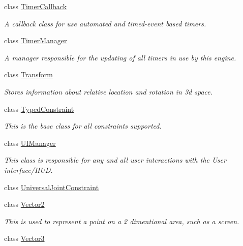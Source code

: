 \begin{DoxyCompactItemize}
class \hyperlink{classMezzanine_1_1TimerCallback}{TimerCallback}
\begin{DoxyCompactList}\small\item\em A callback class for use automated and timed-\/event based timers. \item\end{DoxyCompactList}\item 
class \hyperlink{classMezzanine_1_1TimerManager}{TimerManager}
\begin{DoxyCompactList}\small\item\em A manager responsible for the updating of all timers in use by this engine. \item\end{DoxyCompactList}\item 
class \hyperlink{classMezzanine_1_1Transform}{Transform}
\begin{DoxyCompactList}\small\item\em Stores information about relative location and rotation in 3d space. \item\end{DoxyCompactList}\item 
class \hyperlink{classMezzanine_1_1TypedConstraint}{TypedConstraint}
\begin{DoxyCompactList}\small\item\em This is the base class for all constraints supported. \item\end{DoxyCompactList}\item 
class \hyperlink{classMezzanine_1_1UIManager}{UIManager}
\begin{DoxyCompactList}\small\item\em This class is responsible for any and all user interactions with the User interface/HUD. \item\end{DoxyCompactList}\item 
class \hyperlink{classMezzanine_1_1UniversalJointConstraint}{UniversalJointConstraint}
\item 
class \hyperlink{classMezzanine_1_1Vector2}{Vector2}
\begin{DoxyCompactList}\small\item\em This is used to represent a point on a 2 dimentional area, such as a screen. \item\end{DoxyCompactList}\item 
class \hyperlink{classMezzanine_1_1Vector3}{Vector3}

\end{DoxyCompactItemize}
